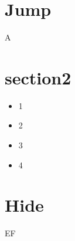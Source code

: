 \documentclass[xcolor=dvipsnames,onlyslideswithnotes,t]{beamer}
\begin{document}
\section{Jump}
\begin{frame}
A 
\end{frame}

\section{section2}
\begin{frame}
\begin{itemize}[<+->]
\item 1
\item 2
\item 3
\item 4
\end{itemize}
\end{frame}

\section{Hide}
\begin{frame}
EF
\end{frame}
\end{document}
